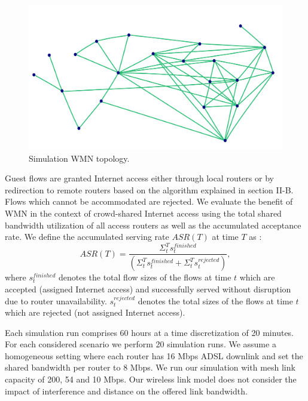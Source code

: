 \begin{figure}[t]
\begin{center}
\includegraphics[width=1\linewidth]{topology.pdf}
\caption{Simulation WMN topology.}
\label{fig:topology}
\end{center}
\end{figure}

Guest flows are granted Internet access either through local routers or by redirection to remote routers based on the algorithm explained in section II-B. Flows which cannot be accommodated are rejected. We evaluate the benefit of WMN in the context of crowd-shared Internet access using the total shared bandwidth utilization of all access routers as well as the accumulated acceptance rate. We define the accumulated serving rate $ASR(T)$ at time $T$ as :
\vspace{-3mm}
\begin{equation}\label{1}
ASR(T)= \frac{\Sigma^T_t s^{finished}_{t}}{(\Sigma^T_t s^{finished}_{t} + \Sigma^T_t s^{rejected}_{t})},
\end{equation}
\vspace{-2mm}
%
where $s^{finished}_{t}$ denotes the total flow sizes of the flows at time $t$ which are accepted (assigned Internet access) and successfully served without disruption due to router unavailability. $s^{rejected}_{t}$ denotes the total sizes of the flows at time $t$ which are rejected (not assigned Internet access).

Each simulation run comprises 60 hours at a time discretization of 20 minutes. For each considered scenario we perform 20 simulation runs. We assume a homogeneous setting where each router has 16 Mbps ADSL downlink and set the shared bandwidth per router to 8 Mbps. We run our simulation with mesh link capacity of 200, 54 and 10 Mbps. Our wireless link model does  not consider the impact of interference and distance on the offered link bandwidth.

